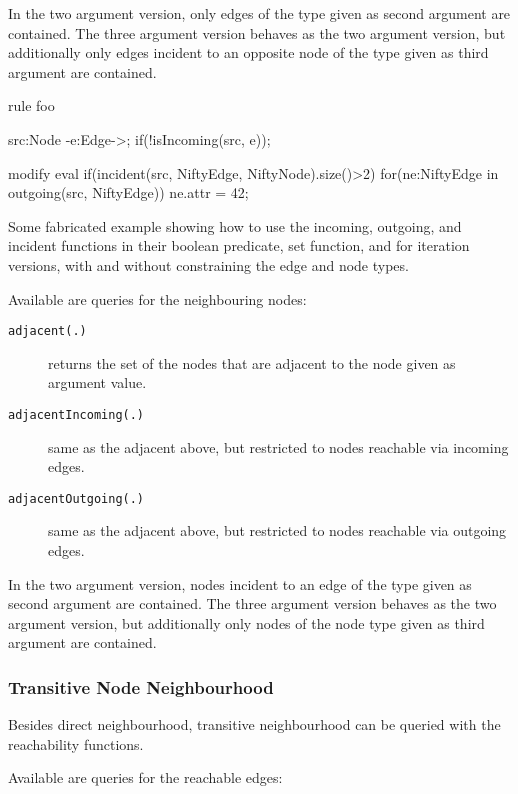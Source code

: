 In the two argument version, only edges of the type given as second argument are contained.
The three argument version behaves as the two argument version, but additionally only edges incident to an opposite node of the type given as third argument are contained.

\begin{example}
\begin{grgen}
rule foo {
    src:Node -e:Edge->; 
    if(!isIncoming(src, e));
    
    modify {
        eval {
            if(incident(src, NiftyEdge, NiftyNode).size()>2)
            {
	              for(ne:NiftyEdge in outgoing(src, NiftyEdge))
	              {
	                  ne.attr = 42;
	              }
	          }
        }
    }
}
\end{grgen}
Some fabricated example showing how to use the incoming, outgoing, and incident functions in their boolean predicate, set function, and for iteration versions, with and without constraining the edge and node types.
\end{example}

Available are queries for the neighbouring nodes:

\begin{description}
\item[\texttt{adjacent(.)}] returns the set of the nodes that are adjacent to the node given as argument value.
\item[\texttt{adjacentIncoming(.)}] same as the adjacent above, but restricted to nodes reachable via incoming edges.
\item[\texttt{adjacentOutgoing(.)}] same as the adjacent above, but restricted to nodes reachable via outgoing edges.
\end{description}

In the two argument version, nodes incident to an edge of the type given as second argument are contained.
The three argument version behaves as the two argument version, but additionally only nodes of the node type given as third argument are contained.

\subsubsection*{Transitive Node Neighbourhood}\label{transitiveneighbour}

Besides direct neighbourhood, transitive neighbourhood can be queried with the reachability functions.

Available are queries for the reachable edges:

